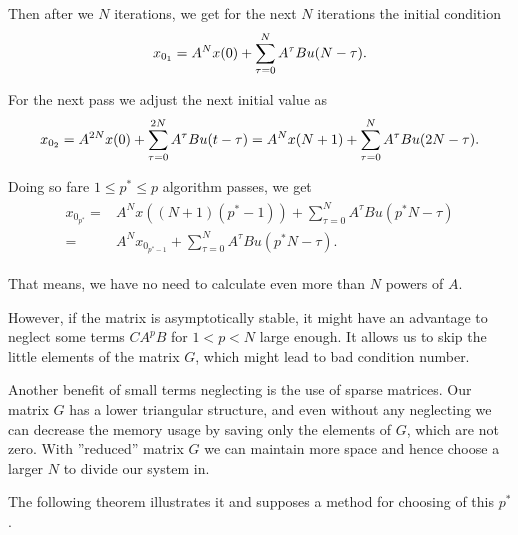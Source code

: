 	Then after we  $N$ iterations, we get for the next $N$ iterations the initial condition
	\begin{align}
	x_{0_{\rm{1}}} = A^{N} x(0) + \sum_{\tau = 0}^N A^{\tau}B u(N - \tau). 
	\end{align}
	
	For the next pass we adjust the next initial value as 
	\begin{align}
	x_{0_{\rm{2}}} = A^{2N} x(0) + \sum_{\tau = 0}^{2N} A^{\tau}B u(t - \tau) = A^N x(N+1) + \sum_{\tau = 0}^N A^{\tau} B u(2N - \tau). 
	\end{align}
	
	Doing so fare $1 \leq p^* \leq p$ algorithm passes, we get 
	\begin{align}
	\label{eq:Appl:new_x0}
	\begin{split}
	x_{0_{p^*}} =& A^N x((N+1)(p^* - 1)) + \sum_{\tau = 0}^N A^{\tau}B u(p^*N - \tau) \\
	=&  A^N x_{0_{p^* - 1}} + \sum_{\tau = 0}^N A^{\tau}B u(p^*N - \tau).
	\end{split}	
	\end{align}
	
	That means, we have no need to calculate even more than $N$ powers of $A$. 
	
	However, if the matrix is asymptotically stable, it might have an advantage to neglect some terms $C A^p B$ for $1<p<N$ large enough. 
	It allows us to skip the little elements of the matrix $G$, which might lead to bad condition number. 

	Another benefit of small terms neglecting is the use of sparse matrices. 	
	Our matrix $G$ has a lower triangular structure, and even without any neglecting we can decrease the memory usage by saving only the elements of $G$, which are not zero. With ''reduced'' matrix $G$ we can maintain more space and hence choose a larger $N$ to divide our system in.
	
	The following theorem illustrates it and supposes a method for choosing of this $p^*$. 
	
